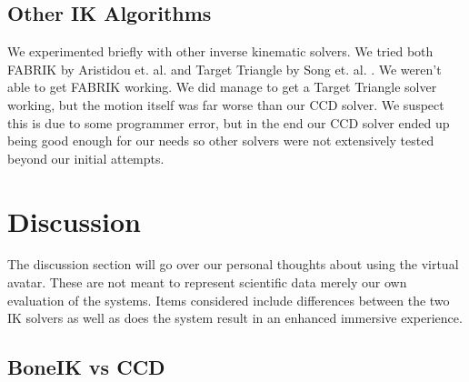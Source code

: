 \documentclass{vgtc}                          %
\begin{document}
\subsection{Other IK Algorithms}

    We experimented briefly with other inverse kinematic solvers. We tried both FABRIK by Aristidou et. al. \cite{FabrikOG} and Target Triangle by Song et. al. \cite{FastIK}. We weren't able to get FABRIK working. We did manage to get a Target Triangle solver working, but the motion itself was far worse than our CCD solver. We suspect this is due to some programmer error, but in the end our CCD solver ended up being good enough for our needs so other solvers were not extensively tested beyond our initial attempts.

\section{Discussion}

    The discussion section will go over our personal thoughts about using the virtual avatar. These are not meant to represent scientific data merely our own evaluation of the systems. Items considered include differences between the two IK solvers as well as does the system result in an enhanced immersive experience.

\subsection{BoneIK vs CCD}
    
\end{document}
